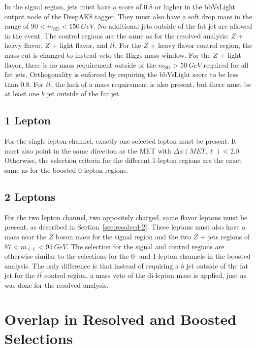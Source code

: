 In the signal region, jets must have a score of 0.8 or higher in the
bbVsLight output node of the DeepAK8 tagger.
They must also have a soft drop mass in the range of $90 < m_\mathrm{SD} < \SI{150}{GeV}$.
No additional jets outside of the fat jet are allowed in the event.
The control regions are the same as for the resolved analysis:
$Z$ + heavy flavor, $Z$ + light flavor, and $t\bar{t}$.
For the $Z$ + heavy flavor control region,
the mass cut is changed to instead veto the Higgs mass window.
For the $Z$ + light flavor, there is no mass requirement outside of the
$m_\textrm{SD} > \SI{50}{GeV}$ required for all fat jets.
Orthogonality is enforced by requiring the bbVsLight score to be less than 0.8.
For $t\bar{t}$, the lack of a mass requirement is also present,
but there must be at least one $b$ jet outside of the fat jet.

\subsection{1 Lepton}

For the single lepton channel, exactly one selected lepton must be present.
It must also point in the same direction as the MET with $\Delta \phi(MET, \ell) < 2.0$.
Otherwise, the selection criteria for the different 1-lepton regions
are the exact same as for the boosted 0-lepton regions.

\subsection{2 Leptons}

For the two lepton channel, two oppositely charged, same flavor leptons must be present,
as described in Section~\ref{sec:resolved-2}.
These leptons must also have a mass near the $Z$ boson mass for the signal region
and the two $Z$ + jets regions of $87 < m_{\ell\ell} < \SI{95}{GeV}$.
The selection for the signal and control regions are otherwise similar to the selections
for the 0- and 1-lepton channels in the boosted analysis.
The only difference is that instead of requiring a $b$ jet outside of the fat jet
for the $t\bar{t}$ control region,
a mass veto of the di-lepton mass is applied, just as was done for the resolved analysis.

\section{Overlap in Resolved and Boosted Selections}

